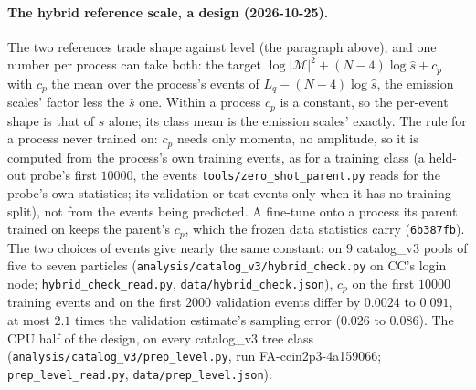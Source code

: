\documentclass[11pt]{article}
\newcommand{\code}[1]{\texttt{#1}}
\begin{document}
\paragraph{The hybrid reference scale, a design (2026-10-25).} The two references trade shape against level (the
paragraph above), and one number per process can take both: the target $\log|\mathcal M|^2+(N-4)\log\hat s+c_p$ with
$c_p$ the mean over the process's events of $L_q-(N-4)\log\hat s$, the emission scales' factor less the $\hat s$ one.
Within a process $c_p$ is a constant, so the per-event shape is that of $\hat s$ alone; its class mean is the emission
scales' exactly. The rule for a process never trained on: $c_p$ needs only momenta, no amplitude, so it is computed
from the process's own training events, as for a training class (a held-out probe's first $10000$, the events
\code{tools/zero\_shot\_parent.py} reads for the probe's own statistics; its validation or test events only when it has
no training split), not from the events being predicted. A fine-tune onto a process its parent trained on keeps the
parent's $c_p$, which the frozen data statistics carry (\code{6b387fb}). The two choices of events give nearly the same
constant: on $9$ catalog\_v3 pools of five to seven particles
(\code{analysis/catalog\_v3/hybrid\_check.py} on CC's login node; \code{hybrid\_check\_read.py},
\code{data/hybrid\_check.json}), $c_p$ on the first $10000$ training events and on the first $2000$ validation events
differ by $0.0024$ to $0.091$, at most $2.1$ times the validation estimate's sampling error ($0.026$ to $0.086$). The
CPU half of the design, on every catalog\_v3 tree class
(\code{analysis/catalog\_v3/prep\_level.py}, run FA-ccin2p3-4a159066; \code{prep\_level\_read.py},
\code{data/prep\_level.json}):
\end{document}
